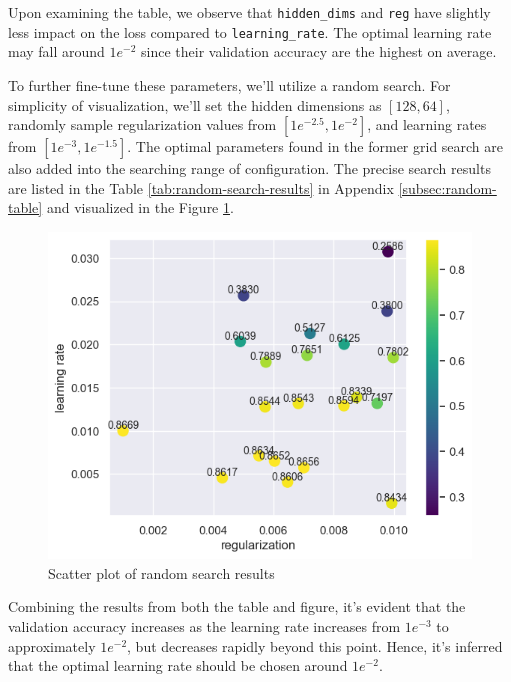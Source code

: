 \documentclass[10pt,a4paper,twoside]{tau}
\begin{document}
Upon examining the table, we observe that \texttt{hidden\_dims} and \texttt{reg} have slightly less impact on the loss compared to \texttt{learning\_rate}. The optimal learning rate may fall around $1e^{-2}$ since their validation accuracy are the highest on average.

To further fine-tune these parameters, we'll utilize a random search. For simplicity of visualization, we'll set the hidden dimensions as $[128, 64]$, randomly sample regularization values from $[1e^{-2.5}, 1e^{-2}]$, and learning rates from $[1e^{-3}, 1e^{-1.5}]$. The optimal parameters found in the former grid search are also added into the searching range of configuration. The precise search results are listed in the Table \ref{tab:random-search-results} in Appendix \ref{subsec:random-table} and visualized in the Figure \ref{fig:random-search}.

\begin{figure}[htbp]
    \centering
    \includegraphics[scale=0.6]{images/random_search_scatter.png}
    \caption{Scatter plot of random search results}
    \label{fig:random-search}
\end{figure}

Combining the results from both the table and figure, it's evident that the validation accuracy increases as the learning rate increases from $1e^{-3}$ to approximately $1e^{-2}$, but decreases rapidly beyond this point. Hence, it's inferred that the optimal learning rate should be chosen around $1e^{-2}$.
\end{document}
